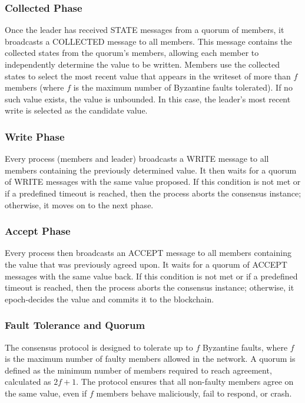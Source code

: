 \documentclass[runningheads]{llncs}
\begin{document}
\subsubsection{Collected Phase}
Once the leader has received STATE messages from a quorum of members, it broadcasts a COLLECTED message to all members. This message contains the collected states from the quorum's members, allowing each member to independently determine the value to be written. Members use the collected states to select the most recent value that appears in the writeset of more than \( f \) members (where \( f \) is the maximum number of Byzantine faults tolerated). If no such value exists, the value is unbounded. In this case, the leader's most recent write is selected as the candidate value.

\subsubsection{Write Phase}
Every process (members and leader) broadcasts a WRITE message to all members containing the previously determined value. It then waits for a quorum of WRITE messages with the same value proposed. If this condition is not met or if a predefined timeout is reached, then the process aborts the consensus instance; otherwise, it moves on to the next phase.

\subsubsection{Accept Phase}
Every process then broadcasts an ACCEPT message to all members containing the value that was previously agreed upon. It waits for a quorum of ACCEPT messages with the same value back. If this condition is not met or if a predefined timeout is reached, then the process aborts the consensus instance; otherwise, it epoch-decides the value and commits it to the blockchain.

\subsubsection{Fault Tolerance and Quorum}
The consensus protocol is designed to tolerate up to \( f \) Byzantine faults, where \( f \) is the maximum number of faulty members allowed in the network. A quorum is defined as the minimum number of members required to reach agreement, calculated as \( 2f+1 \). The protocol ensures that all non-faulty members agree on the same value, even if \( f \) members behave maliciously, fail to respond, or crash.
\end{document}
